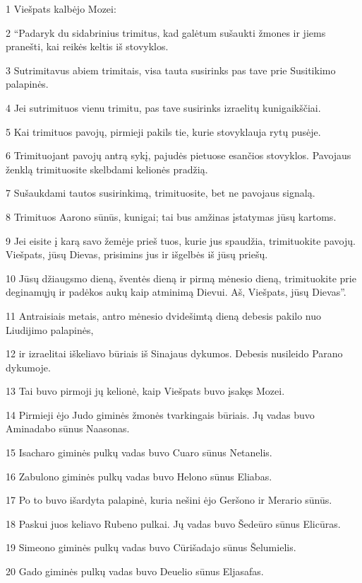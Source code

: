 \par 1 Viešpats kalbėjo Mozei: 
\par 2 “Padaryk du sidabrinius trimitus, kad galėtum sušaukti žmones ir jiems pranešti, kai reikės keltis iš stovyklos. 
\par 3 Sutrimitavus abiem trimitais, visa tauta susirinks pas tave prie Susitikimo palapinės. 
\par 4 Jei sutrimituos vienu trimitu, pas tave susirinks izraelitų kunigaikščiai. 
\par 5 Kai trimituos pavojų, pirmieji pakils tie, kurie stovyklauja rytų pusėje. 
\par 6 Trimituojant pavojų antrą sykį, pajudės pietuose esančios stovyklos. Pavojaus ženklą trimituosite skelbdami kelionės pradžią. 
\par 7 Sušaukdami tautos susirinkimą, trimituosite, bet ne pavojaus signalą. 
\par 8 Trimituos Aarono sūnūs, kunigai; tai bus amžinas įstatymas jūsų kartoms. 
\par 9 Jei eisite į karą savo žemėje prieš tuos, kurie jus spaudžia, trimituokite pavojų. Viešpats, jūsų Dievas, prisimins jus ir išgelbės iš jūsų priešų. 
\par 10 Jūsų džiaugsmo dieną, šventės dieną ir pirmą mėnesio dieną, trimituokite prie deginamųjų ir padėkos aukų kaip atminimą Dievui. Aš, Viešpats, jūsų Dievas”. 
\par 11 Antraisiais metais, antro mėnesio dvidešimtą dieną debesis pakilo nuo Liudijimo palapinės, 
\par 12 ir izraelitai iškeliavo būriais iš Sinajaus dykumos. Debesis nusileido Parano dykumoje. 
\par 13 Tai buvo pirmoji jų kelionė, kaip Viešpats buvo įsakęs Mozei. 
\par 14 Pirmieji ėjo Judo giminės žmonės tvarkingais būriais. Jų vadas buvo Aminadabo sūnus Naasonas. 
\par 15 Isacharo giminės pulkų vadas buvo Cuaro sūnus Netanelis. 
\par 16 Zabulono giminės pulkų vadas buvo Helono sūnus Eliabas. 
\par 17 Po to buvo išardyta palapinė, kuria nešini ėjo Geršono ir Merario sūnūs. 
\par 18 Paskui juos keliavo Rubeno pulkai. Jų vadas buvo Šedeūro sūnus Elicūras. 
\par 19 Simeono giminės pulkų vadas buvo Cūrišadajo sūnus Šelumielis. 
\par 20 Gado giminės pulkų vadas buvo Deuelio sūnus Eljasafas. 
